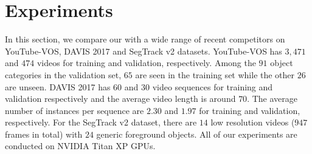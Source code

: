 \section{Experiments}

In this section, we compare our {\ourmodelshort} with a wide range of recent competitors on YouTube-VOS, DAVIS 2017 and SegTrack v2 datasets. 
YouTube-VOS has $3,471$ and $474$ videos for training and validation, respectively. Among the $91$ object categories in the validation set, $65$ are seen in the training set while the other $26$ are unseen. 
DAVIS 2017 has $60$ and $30$ video sequences for training and validation respectively and the average video length is around $70$.
The average number of instances per sequence are $2.30$ and $1.97$ for training and validation, respectively.
For the SegTrack v2 dataset, there are $14$ low resolution videos ($947$ frames in total) with $24$ generic foreground objects.
All of our experiments are conducted on NVIDIA Titan XP GPUs.

\begin{table}[t]
\caption{Results on YouTube-VOS (validation set) and frame-per-second (FPS) during inference for methods withour online learning. `$\mathcal{S}$' and `$\mathcal{U}$' denote the seen and unseen categories. `OL': online learning. `+' means we use ResNet-101 as feature extractor instead of ResNet-50}
\vspace{-5mm}
\label{tab:youtubevos}
\end{table}

